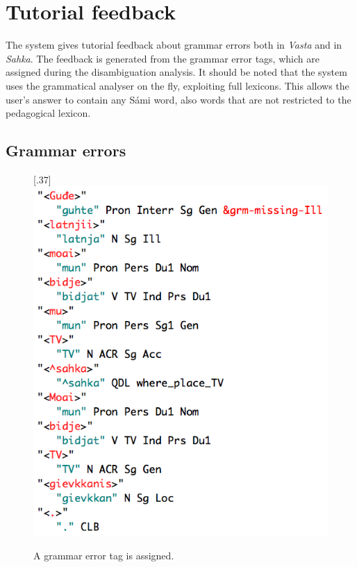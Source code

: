 \documentclass[11pt]{article}
\begin{document}
\section{Tutorial feedback} \label{tutorial}
The system gives tutorial feedback about grammar errors both in \textit{Vasta} and in \textit{Sahka}. The feedback is generated from the grammar error tags, which are assigned during the disambiguation analysis. It should be noted that the system uses the grammatical analyser on the fly, exploiting full lexicons. This allows the user's answer to contain any Sámi word, also words that are not restricted to the pedagogical lexicon.

\subsection{Grammar errors} \label{grammarerrors}

\begin{figure}[htbp]
\begin{center}
\scalebox{.37}[.37]{\includegraphics{presentation/img/gievkkanisAnalEng.png}}\\
\caption{A grammar error tag is assigned. }
\label{hivssetloc}
\end{center}
\end{figure}
\end{document}
